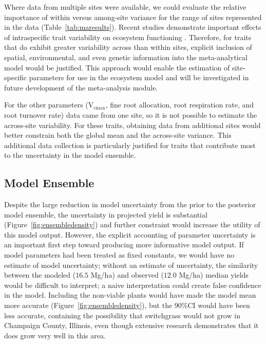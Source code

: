 \documentclass[12pt]{article}
\begin{document}
\begin{flushleft}
\begin{spacing}{1.9}
 Where data from multiple sites were available, we could evaluate the relative importance of within versus among-site variance for the range of sites represented in the data (Table~\ref{tab:maresults}). 
 Recent studies demonstrate important effects of intraspecific trait variability on ecosystem functioning \citep{breza2012wbv,albert2011whs,violle2012rvi}.
 Therefore, for traits that do exhibit greater variability across than within sites, explicit inclusion of spatial, environmental, and even genetic information into the meta-analytical model would be justified.
 This approach would enable the estimation of site-specific parameters for use in the ecosystem model and will be investigated in future development of the meta-analysis module.


 For the other parameters (V$_{\text{cmax}}$, fine root allocation, root respiration rate, and root turnover rate) data came from one site, so it is not possible to estimate the across-site variability.
 For these traits, obtaining data from additional sites would better constrain both the global mean and the across-site variance.
 This additional data collection is particularly justified for traits that contribute most to the uncertainty in the model ensemble.

\subsection*{Model Ensemble}

 Despite the large reduction in model uncertainty from the prior to the posterior model ensemble, the uncertainty in projected yield is substantial (Figure~\ref{fig:ensembledensity}) and further constraint would increase the utility of this model output.
 However, the explicit accounting of parameter uncertainty is an important first step toward producing more informative model output.
 If model parameters had been treated as fixed constants, we would have no estimate of model uncertainty; without an estimate of uncertainty, the similarity between the modeled ($16.5$ Mg/ha) and observed ($12.0$ Mg/ha) median yields would be difficult to interpret; a naive interpretation could create false confidence in the model.
 Including the non-viable plants would have made the model mean more accurate (Figure~\ref{fig:ensembledensity}), but the 90\%CI would have been less accurate, containing the possibility that switchgrass would not grow in Champaign County, Illinois, even though extensive research \citep[][personal observation]{heaton2008mub,vanloocke2012rcw} demonstrates that it does grow very well in this area.


\end{spacing}
\end{flushleft}
\end{document}
